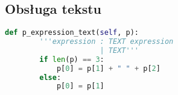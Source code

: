 \subsection{Obsługa tekstu}

\begin{lstlisting}[language={Python}, caption={Gramatyka - tekst}, label={gramatyka-tekst}]
    def p_expression_text(self, p):
        '''expression : TEXT expression
                      | TEXT'''
        if len(p) == 3:
            p[0] = p[1] + " " + p[2]
        else:
            p[0] = p[1]
\end{lstlisting}